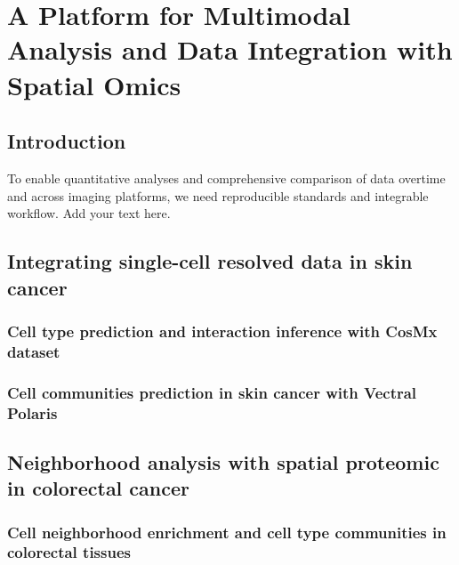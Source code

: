 \chapter[A Platform for Multimodal Analysis and Data Integration with Spatial Omics]{A Platform for Multimodal Analysis and Data Integration with Spatial Omics}
\label{Chap:4}	%
\pagestyle{headings}
\section{Introduction}
\label{Sec:4.1_intro}	%
To enable quantitative analyses and comprehensive comparison of data overtime and across imaging platforms, we need reproducible standards and integrable workflow.   
Add your text here. 

\section{Integrating single-cell resolved data in skin cancer}
\label{Sec:4.2_Cell_communities}	%
\subsection{Cell type prediction and interaction inference with CosMx dataset}
\subsection{Cell communities prediction in skin cancer with Vectral Polaris }

\subsection{}
\section{Neighborhood analysis with spatial proteomic in colorectal cancer}
\label{Sec:4.2_CCC_in_COAD}	%
\subsection{Cell neighborhood enrichment and cell type communities in colorectal tissues}
